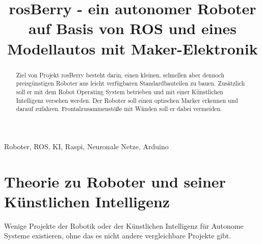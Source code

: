 \documentclass[conference]{IEEEtran}
\begin{document}
\title{rosBerry - ein autonomer Roboter auf Basis von ROS und eines Modellautos mit Maker-Elektronik}

\author{
%
\and
{}
\and
{}
}

\maketitle

\begin{abstract}
Ziel von Projekt rosBerry besteht darin, einen kleinen, schnellen aber dennoch preisgünstigen Roboter aus leicht verfügbaren Standardbauteilen zu bauen.
Zusätzlich soll er mit dem Robot Operating System betrieben und mit einer Künstlichen Intelligenz versehen werden.
Der Roboter soll einen optischen Marker erkennen und darauf zufahren.
Frontalzusammenstöße mit Wänden soll er dabei vermeiden.
\end{abstract}

\begin{IEEEkeywords}
Roboter, ROS, KI, Raspi, Neuronale Netze, Arduino
\end{IEEEkeywords}

\section{Theorie zu Roboter und seiner Künstlichen Intelligenz}


Wenige Projekte der Robotik oder der Künstlichen Intelligenz für Autonome Systeme existieren, ohne das es nicht andere vergleichbare Projekte gibt.
\end{document}
